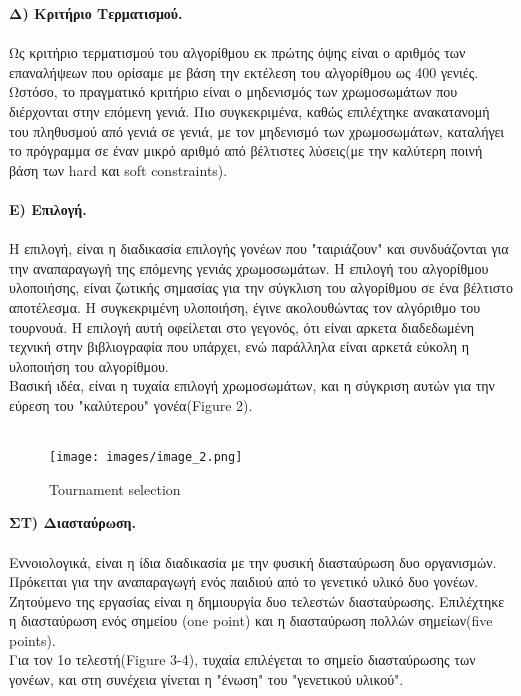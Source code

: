 \documentclass[12pt]{article}
\begin{document}
{\bfseries Δ) Κριτήριο Τερματισμού.}\\\\
Ως κριτήριο τερματισμού του αλγορίθμου εκ πρώτης όψης είναι ο αριθμός των επαναλήψεων που ορίσαμε με βάση την εκτέλεση του αλγορίθμου ως 400 γενιές. Ωστόσο, το πραγματικό κριτήριο είναι ο μηδενισμός των χρωμοσωμάτων που διέρχονται στην επόμενη γενιά. Πιο συγκεκριμένα, καθώς επιλέχτηκε ανακατανομή του πληθυσμού από γενιά σε γενιά, με τον μηδενισμό των χρωμοσωμάτων, καταλήγει το πρόγραμμα σε έναν μικρό αριθμό από βέλτιστες λύσεις(με την καλύτερη ποινή βάση των hard και soft constraints). \\\\
{\bfseries Ε) Επιλογή.}\\\\
Η επιλογή, είναι η διαδικασία επιλογής γονέων που "ταιριάζουν" και συνδυάζονται για την αναπαραγωγή της επόμενης γενιάς χρωμοσωμάτων. Η επιλογή του αλγορίθμου υλοποιήσης, είναι ζωτικής σημασίας για την σύγκλιση του αλγορίθμου σε ένα βέλτιστο αποτέλεσμα. Η συγκεκριμένη υλοποιήση, έγινε ακολουθώντας τον αλγόριθμο του τουρνουά. Η επιλογή αυτή οφείλεται στο γεγονός, ότι είναι αρκετα διαδεδωμένη τεχνική στην βιβλιογραφία που υπάρχει, ενώ παράλληλα είναι αρκετά εύκολη η υλοποιήση του αλγορίθμου.\\ Βασική ιδέα, είναι η τυχαία επιλογή χρωμοσωμάτων, και η σύγκριση αυτών για την εύρεση του "καλύτερου" γονέα(Figure 2).\\\\

\begin{figure}[!h]
    \centering
    \texttt{[image: images/image\_2.png]}
    \caption{Tournament selection}
    \label{fig:my_label}
\end{figure}

{\bfseries ΣΤ) Διασταύρωση.}\\\\
Εννοιολογικά, είναι η ίδια διαδικασία με την φυσική διασταύρωση δυο οργανισμών. Πρόκειται για την αναπαραγωγή ενός παιδιού από το γενετικό υλικό δυο γονέων. Ζητούμενο της εργασίας είναι η δημιουργία δυο τελεστών διασταύρωσης. Επιλέχτηκε η διασταύρωση ενός σημείου (one point) και η διασταύρωση πολλών σημείων(five points).\\
Για τον 1ο τελεστή(Figure 3-4), τυχαία επιλέγεται το σημείο διασταύρωσης των γονέων, και στη συνέχεια γίνεται η "ένωση" του "γενετικού υλικού".\\
\end{document}
